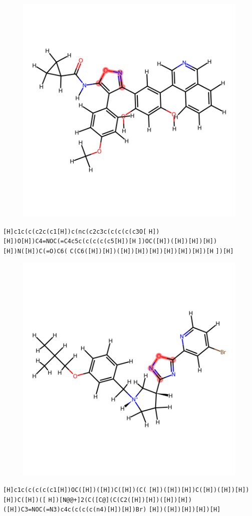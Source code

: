 \documentclass{article}
\begin{document}
\begin{figure}[ht]
\centering
    \includegraphics{mol160.png}
\end{figure}
\verb|[H]c1c(c(c2c(c1[H])c(nc(c2c3c(c(c(c(c3O[| \verb|H])[H])O[H])C4=NOC(=C4c5c(c(c(c(c5[H])[H| \verb|])OC([H])([H])[H])[H])[H])N([H])C(=O)C6(| \verb|C(C6([H])[H])([H])[H])[H])[H])[H])[H])[H| \verb|])[H]|

\begin{figure}[ht]
\centering
    \includegraphics{mol161.png}
\end{figure}
\verb|[H]c1c(c(c(c(c1[H])OC([H])([H])C([H])(C(| \verb|[H])([H])[H])C([H])([H])[H])[H])C([H])([| \verb|H])[N@@+]2(C([C@](C(C2([H])[H])([H])[H])| \verb|([H])C3=NOC(=N3)c4c(c(c(c(n4)[H])[H])Br)| \verb|[H])([H])[H])[H])[H]|
\end{document}
